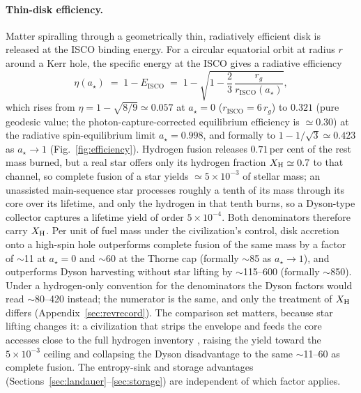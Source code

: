 \documentclass[11pt]{article}
\newcommand{\astar}{\ensuremath{a_\star}}
\begin{document}
\paragraph{Thin-disk efficiency.} Matter spiralling through a geometrically thin, radiatively efficient disk is released at the ISCO binding energy. For a circular equatorial orbit at radius $r$ around a Kerr hole, the specific energy at the ISCO gives a radiative efficiency \citep{BardeenPressTeukolsky1972,NovikovThorne1973}
\begin{equation}
\eta(\astar) \;=\; 1 - E_{\mathrm{ISCO}}
\;=\; 1 - \sqrt{1 - \frac{2}{3}\,\frac{r_g}{r_{\mathrm{ISCO}}(\astar)}},
\label{eq:eta}
\end{equation}
which rises from $\eta = 1-\sqrt{8/9} \simeq 0.057$ at $\astar = 0$ ($r_{\mathrm{ISCO}} = 6\,r_g$) to $0.321$ (pure geodesic value; the photon-capture-corrected equilibrium efficiency is $\simeq 0.30$) at the \citet{Thorne1974} radiative spin-equilibrium limit $\astar = 0.998$, and formally to $1 - 1/\sqrt{3} \simeq 0.423$ as $\astar \to 1$ (Fig.~\ref{fig:efficiency}). Hydrogen fusion releases $0.71$\,per cent of the rest mass burned, but a real star offers only its hydrogen fraction $X_{\rm H} \simeq 0.7$ to that channel, so complete fusion of a star yields $\simeq 5\times10^{-3}$ of stellar mass; an unassisted main-sequence star processes roughly a tenth of its mass through its core over its lifetime, and only the hydrogen in that tenth burns, so a Dyson-type collector \citep{Dyson1960} captures a lifetime yield of order $5\times10^{-4}$. Both denominators therefore carry $X_{\rm H}$. Per unit of fuel mass under the civilization's control, disk accretion onto a high-spin hole outperforms complete fusion of the same mass by a factor of $\sim$11 at $\astar = 0$ and $\sim$60 at the Thorne cap (formally $\sim$85 as $\astar \to 1$), and outperforms Dyson harvesting without star lifting by $\sim$115--600 (formally $\sim$850). Under a hydrogen-only convention for the denominators the Dyson factors would read $\sim$80--420 instead; the numerator is the same, and only the treatment of $X_{\rm H}$ differs (Appendix~\ref{sec:revrecord}). The comparison set matters, because star lifting changes it: a civilization that strips the envelope and feeds the core accesses close to the full hydrogen inventory \citep{Criswell1985,Matloff2017,ScogginsKipping2023}, raising the yield toward the $5\times10^{-3}$ ceiling and collapsing the Dyson disadvantage to the same $\sim$11--60 as complete fusion. The entropy-sink and storage advantages (Sections~\ref{sec:landauer}--\ref{sec:storage}) are independent of which factor applies.
\end{document}

